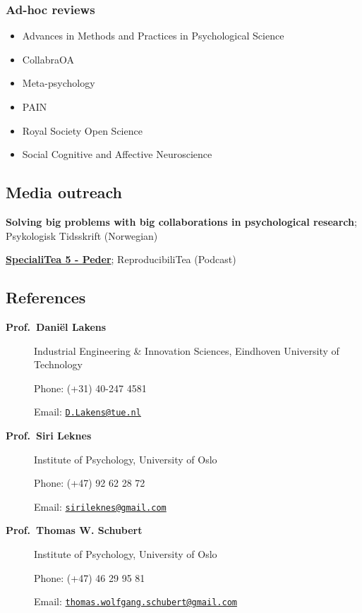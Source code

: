 \documentclass[]{article}
\providecommand{\tightlist}{%
  \setlength{\itemsep}{0pt}\setlength{\parskip}{0pt}}
\begin{document}
\hypertarget{ad-hoc-reviews}{%
\subsubsection{Ad-hoc reviews}\label{ad-hoc-reviews}}

\begin{itemize}
\tightlist
\item
  Advances in Methods and Practices in Psychological Science
\item
  CollabraOA
\item
  Meta-psychology
\item
  PAIN
\item
  Royal Society Open Science
\item
  Social Cognitive and Affective Neuroscience
\end{itemize}

\hypertarget{media-outreach}{%
\subsection{Media outreach}\label{media-outreach}}

\begin{description}
\tightlist
\item[2018]
\textbf{Solving big problems with big collaborations in psychological
research}; Psykologisk Tidsskrift (Norwegian)\\
\item[2018]
\textbf{\href{https://soundcloud.com/reproducibilitea/specialitea-5-peder}{SpecialiTea
5 - Peder}}; ReproducibiliTea (Podcast)
\end{description}

\hypertarget{references}{%
\subsection{References}\label{references}}

\begin{description}
\item[\textbf{Prof.~Daniël Lakens}]
Industrial Engineering \& Innovation Sciences, Eindhoven University of
Technology

Phone: (+31) 40-247 4581

Email: \href{mailto:D.Lakens@tue.nl}{\nolinkurl{D.Lakens@tue.nl}}
\item[\textbf{Prof.~Siri Leknes}]
Institute of Psychology, University of Oslo

Phone: (+47) 92 62 28 72

Email:
\href{mailto:sirileknes@gmail.com}{\nolinkurl{sirileknes@gmail.com}}
\item[\textbf{Prof.~Thomas W. Schubert}]
Institute of Psychology, University of Oslo

Phone: (+47) 46 29 95 81

Email:
\href{mailto:thomas.wolfgang.schubert@gmail.com}{\nolinkurl{thomas.wolfgang.schubert@gmail.com}}
\end{description}
\end{document}
